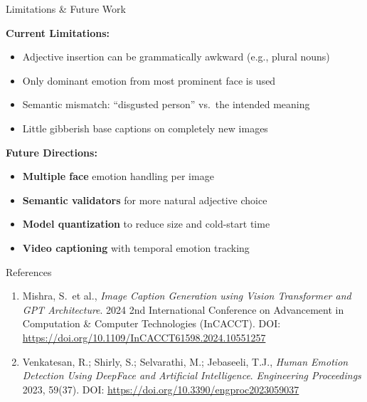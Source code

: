 \documentclass{beamer}
\begin{document}
\begin{frame}{Limitations \& Future Work}

    \textbf{Current Limitations:}
    \begin{itemize}
        \item Adjective insertion can be grammatically awkward (e.g., plural nouns)
        \item Only dominant emotion from most prominent face is used
        \item Semantic mismatch: ``disgusted person'' vs.\ the intended meaning
        \item Little gibberish base captions on completely new images
    \end{itemize}

    \vspace{0.4cm}
    \textbf{Future Directions:}
    \begin{itemize}
        \item \textbf{Multiple face} emotion handling per image
        \item \textbf{Semantic validators} for more natural adjective choice
        \item \textbf{Model quantization} to reduce size and cold-start time
        \item \textbf{Video captioning} with temporal emotion tracking
    \end{itemize}

\end{frame}

\begin{frame}{References}

    \begin{enumerate}\small
        \item Mishra, S.\ et al., \textit{Image Caption Generation using Vision Transformer and GPT Architecture}. 2024 2nd International Conference on Advancement in Computation \& Computer Technologies (InCACCT). DOI: \url{https://doi.org/10.1109/InCACCT61598.2024.10551257}

        \vspace{0.55cm}
        \item Venkatesan, R.; Shirly, S.; Selvarathi, M.; Jebaseeli, T.J., \textit{Human Emotion Detection Using DeepFace and Artificial Intelligence}. \textit{Engineering Proceedings} 2023, 59(37). DOI: \url{https://doi.org/10.3390/engproc2023059037}
    \end{enumerate}

\end{frame}
\end{document}
